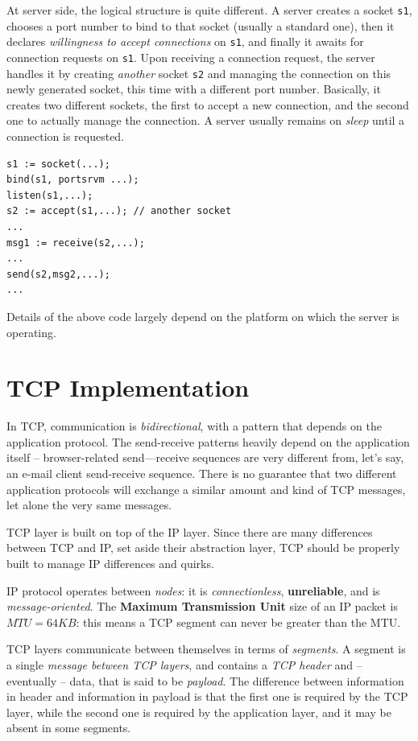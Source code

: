 \documentclass[10pt]{book}
\begin{document}
At server side, the logical structure is quite different. A server creates
a socket \texttt{s1}, chooses a port number to bind to that socket (usually a
standard one), then it declares \emph{willingness to accept connections} on
\texttt{s1}, and finally it awaits for connection requests on \texttt{s1}. Upon
receiving a connection request, the server handles it by creating
\emph{another} socket \texttt{s2} and managing the connection on this newly
generated socket, this time with a different port number.  Basically, it
creates two different sockets, the first to accept a new connection, and the
second one to actually manage the connection. A server usually remains on
\emph{sleep} until a connection is requested.

\begin{verbatim} 
s1 := socket(...);
bind(s1, portsrvm ...);
listen(s1,...);
s2 := accept(s1,...); // another socket 
... 
msg1 := receive(s2,...);
...
send(s2,msg2,...);
... 
\end{verbatim}

Details of the above code largely depend on the platform on which the server is
operating.

\section{TCP Implementation}

In TCP, communication is \emph{bidirectional}, with a pattern that depends on
the application protocol. The send-receive patterns heavily depend on the
application itself \--- browser-related send\----receive sequences are very
different from, let's say, an e-mail client send-receive sequence. There is no
guarantee that two different application protocols will exchange a similar
amount and kind of TCP messages, let alone the very same messages.

TCP layer is built on top of the IP layer. Since there are many differences
between TCP and IP, set aside their abstraction layer, TCP should be properly
built to manage IP differences and quirks. 

IP protocol operates between \emph{nodes}: it is \emph{connectionless},
\textbf{unreliable}, and is \emph{message-oriented}. The \textbf{Maximum Transmission
Unit} size of an IP packet is $MTU = 64KB$: this means a TCP segment can never
be greater than the MTU.

TCP layers communicate between themselves in terms of \emph{segments}. A
segment is a single \emph{message between TCP layers}, and contains a \emph{TCP
header} and \--- eventually \--- data, that is said to be \emph{payload}. The
difference between information in header and information in payload is that the
first one is required by the TCP layer, while the second one is required by the
application layer, and it may be absent in some segments.
\end{document}
